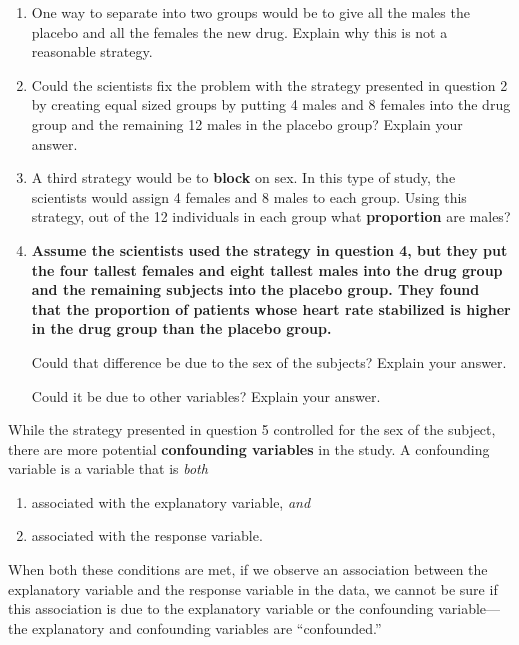 \documentclass[
]{report}
\providecommand{\tightlist}{%
  \setlength{\itemsep}{0pt}\setlength{\parskip}{0pt}}
\begin{document}
\begin{enumerate}
\def\labelenumi{\arabic{enumi}.}
\setcounter{enumi}{1}
\item
  One way to separate into two groups would be to give all the males the placebo and all the females the new drug. Explain why this is not a reasonable strategy.
  \vspace{1in}
\item
  Could the scientists fix the problem with the strategy presented in question 2 by creating equal sized groups by putting 4 males and 8 females into the drug group and the remaining 12 males in the placebo group? Explain your answer.
  \vspace{0.5in}
\item
  A third strategy would be to \textbf{block} on sex. In this type of study, the scientists would assign 4 females and 8 males to each group. Using this strategy, out of the 12 individuals in each group what \textbf{proportion} are males?
  \vspace{0.3in}
\item
  \textbf{Assume the scientists used the strategy in question 4, but they put the four tallest females and eight tallest males into the drug group and the remaining subjects into the placebo group. They found that the proportion of patients whose heart rate stabilized is higher in the drug group than the placebo group.}\\
  \vspace{0.1in}

  Could that difference be due to the sex of the subjects? Explain your answer.
  \vspace{0.5in}

  Could it be due to other variables? Explain your answer.
  \vspace{0.5in}
\end{enumerate}

While the strategy presented in question 5 controlled for the sex of the subject, there are more potential \textbf{confounding variables} in the study. A confounding variable is a variable that is \emph{both}

\begin{enumerate}
\def\labelenumi{\arabic{enumi}.}
\tightlist
\item
  associated with the explanatory variable, \emph{and}
\item
  associated with the response variable.
\end{enumerate}

When both these conditions are met, if we observe an association between the explanatory variable and the response variable in the data, we cannot be sure if this association is due to the explanatory variable or the confounding variable---the explanatory and confounding variables are ``confounded.''
\end{document}
